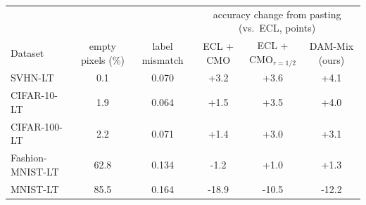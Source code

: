 \begin{tabular}{l cc ccc}
\toprule
 & & & \multicolumn{3}{c}{accuracy change from pasting (vs.\ ECL, points)} \\
Dataset & empty pixels (\%) & label mismatch & ECL + CMO & ECL + CMO$_{r=1/2}$ & DAM-Mix (ours) \\
\midrule
SVHN-LT & 0.1 & 0.070 & +3.2 & +3.6 & +4.1 \\
CIFAR-10-LT & 1.9 & 0.064 & +1.5 & +3.5 & +4.0 \\
CIFAR-100-LT & 2.2 & 0.071 & +1.4 & +3.0 & +3.1 \\
Fashion-MNIST-LT & 62.8 & 0.134 & -1.2 & +1.0 & +1.3 \\
MNIST-LT & 85.5 & 0.164 & -18.9 & -10.5 & -12.2 \\
\bottomrule
\end{tabular}
